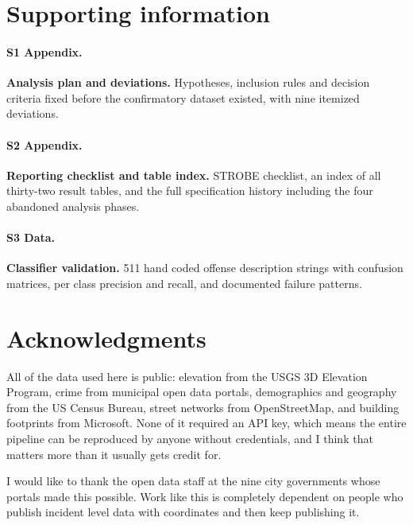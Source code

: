 \documentclass[11pt,letterpaper]{article}
\begin{document}
\section{Supporting information}

\paragraph{S1 Appendix.} {\bf Analysis plan and deviations.} Hypotheses, inclusion
rules and decision criteria fixed before the confirmatory dataset existed, with nine
itemized deviations.

\paragraph{S2 Appendix.} {\bf Reporting checklist and table index.} STROBE checklist,
an index of all thirty-two result tables, and the full specification history including
the four abandoned analysis phases.

\paragraph{S3 Data.} {\bf Classifier validation.} 511 hand coded offense description
strings with confusion matrices, per class precision and recall, and documented
failure patterns.

\section{Acknowledgments}

All of the data used here is public: elevation from the USGS 3D Elevation Program,
crime from municipal open data portals, demographics and geography from the US Census
Bureau, street networks from OpenStreetMap, and building footprints from Microsoft.
None of it required an API key, which means the entire pipeline can be reproduced by
anyone without credentials, and I think that matters more than it usually gets credit
for.

I would like to thank the open data staff at the nine city governments whose portals
made this possible. Work like this is completely dependent on people who publish
incident level data with coordinates and then keep publishing it.
\end{document}

